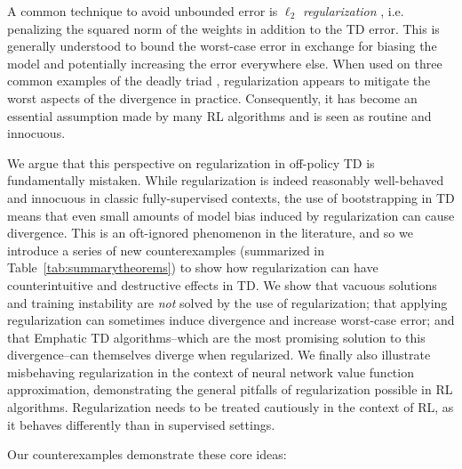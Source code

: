 A common technique to avoid unbounded error is $\ell_2$ \emph{regularization} \cite{tikhonov1943stability}, i.e. penalizing the squared norm of the weights in addition to the TD error.  This is generally understood to bound the worst-case error in exchange for biasing the model and potentially increasing the error everywhere else.  When used on three common examples of the deadly triad \cite[pg.260]{kolter2011fixed,baird1993counterexample,sutton2020reinforcement}, regularization appears to mitigate the worst aspects of the divergence in practice.  Consequently, it has become an essential assumption made by many RL algorithms \cite{diddigi2019convergent,mahadevan2014proximal,sutton2009fast,yu2017convergence,zhang2020provably,zhang2021breaking,kumar2022dr} and is seen as routine and innocuous.

We argue that this perspective on regularization in off-policy TD is fundamentally mistaken.  While regularization is indeed reasonably well-behaved and innocuous in classic fully-supervised contexts, the use of bootstrapping in TD means that even small amounts of model bias induced by regularization can cause divergence.  This is an oft-ignored phenomenon in the literature, and so we introduce a series of new counterexamples (summarized in Table~\ref{tab:summarytheorems}) to show how regularization can have counterintuitive and destructive effects in TD. We show that vacuous solutions and training instability are \emph{not} solved by the use of regularization; that applying regularization can sometimes induce divergence and increase worst-case error; and that Emphatic TD algorithms--which are the most promising solution to this divergence--can themselves diverge when regularized. We finally also illustrate misbehaving regularization in the context of neural network value function approximation, demonstrating the general pitfalls of regularization possible in RL algorithms.  Regularization needs to be treated cautiously in the context of RL, as it behaves differently than in supervised settings.

Our counterexamples demonstrate these core ideas:

